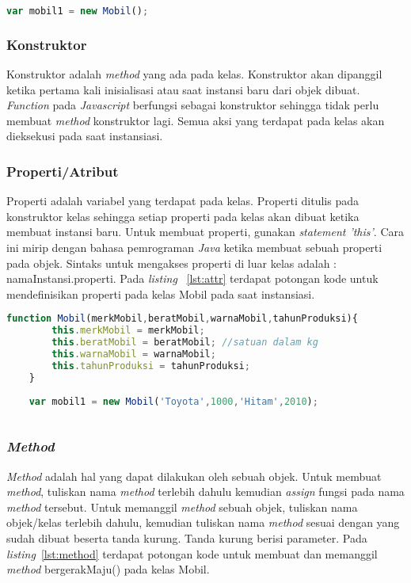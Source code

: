 \begin{lstlisting}[language=Javascript, caption=Membuat instansi mobil, label={lst:object}]
	var mobil1 = new Mobil();
\end{lstlisting}

\subsubsection{Konstruktor}
Konstruktor adalah \textit{method} yang ada pada kelas. Konstruktor akan dipanggil ketika pertama kali inisialisasi atau saat instansi baru dari objek dibuat. \textit{Function} pada \textit{Javascript} berfungsi sebagai konstruktor sehingga tidak perlu membuat \textit{method} konstruktor lagi. Semua aksi yang terdapat pada kelas akan dieksekusi pada saat instansiasi.

\subsubsection{Properti/Atribut}
Properti adalah variabel yang terdapat pada kelas. Properti ditulis pada konstruktor kelas sehingga setiap properti pada kelas akan dibuat ketika membuat instansi baru. Untuk membuat properti, gunakan \textit{statement 'this'}. Cara ini mirip dengan bahasa pemrograman \textit{Java} ketika membuat sebuah properti pada objek. Sintaks untuk mengakses properti di luar kelas adalah : namaInstansi.properti. Pada \textit{listing} ~\ref{lst:attr} terdapat potongan kode untuk mendefinisikan properti pada kelas Mobil pada saat instansiasi.

\begin{lstlisting}[language=Javascript, caption=Mendefinisikan properti pada kelas Mobil, label={lst:attr}]
	function Mobil(merkMobil,beratMobil,warnaMobil,tahunProduksi){
		this.merkMobil = merkMobil;
		this.beratMobil = beratMobil; //satuan dalam kg
		this.warnaMobil = warnaMobil;
		this.tahunProduksi = tahunProduksi;
	}
	
	var mobil1 = new Mobil('Toyota',1000,'Hitam',2010);
	
\end{lstlisting}

\subsubsection{\textit{Method}}
\textit{Method} adalah hal yang dapat dilakukan oleh sebuah objek. Untuk membuat \textit{method}, tuliskan nama \textit{method} terlebih dahulu kemudian \textit{assign} fungsi pada nama \textit{method} tersebut. Untuk memanggil \textit{method} sebuah objek, tuliskan nama objek/kelas terlebih dahulu, kemudian tuliskan nama \textit{method} sesuai dengan yang sudah dibuat beserta tanda kurung. Tanda kurung berisi parameter. Pada \textit{listing}~\ref{lst:method} terdapat potongan kode untuk membuat dan memanggil \textit{method} bergerakMaju() pada kelas Mobil.

